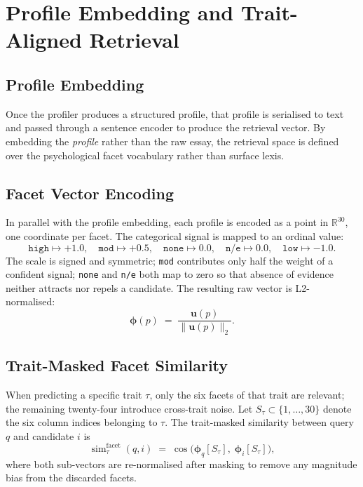 \documentclass[../main.tex]{subfiles}
\begin{document}
\section{Profile Embedding and Trait-Aligned Retrieval}
\label{sec:retrieval}

\subsection{Profile Embedding}
\label{subsec:profile-embedding}

Once the profiler produces a structured profile, that profile is serialised to
text and passed through a sentence encoder to produce the retrieval vector. By
embedding the \emph{profile} rather than the raw essay, the retrieval space is
defined over the psychological facet vocabulary rather than surface lexis.

\subsection{Facet Vector Encoding}
\label{subsec:facet-encoding}

In parallel with the profile embedding, each profile is encoded as a point
in $\mathbb{R}^{30}$, one coordinate per facet. The categorical signal is
mapped to an ordinal value:
%
\begin{equation}
  \label{eq:signal-map}
  \texttt{high}\mapsto +1.0,\quad
  \texttt{mod}\mapsto +0.5,\quad
  \texttt{none}\mapsto 0.0,\quad
  \texttt{n/e}\mapsto 0.0,\quad
  \texttt{low}\mapsto -1.0.
\end{equation}
%
The scale is signed and symmetric; \texttt{mod} contributes only half the
weight of a confident signal; \texttt{none} and \texttt{n/e} both map to
zero so that absence of evidence neither attracts nor repels a candidate.
The resulting raw vector is L2-normalised:
%
\begin{equation}
  \label{eq:facet-vector}
  \boldsymbol{\phi}(p) \;=\; \frac{\mathbf{u}(p)}{\lVert \mathbf{u}(p) \rVert_2}.
\end{equation}

\subsection{Trait-Masked Facet Similarity}
\label{subsec:trait-slice}

When predicting a specific trait $\tau$, only the six facets of that trait are
relevant; the remaining twenty-four introduce cross-trait noise. Let
$S_\tau \subset \{1,\dots,30\}$ denote the six column indices belonging to
$\tau$. The trait-masked similarity between query $q$ and candidate $i$ is
%
\begin{equation}
  \label{eq:facet-cosine}
  \operatorname{sim}^{\mathrm{facet}}_{\tau}(q, i)
  \;=\;
  \cos\!\big(
    \boldsymbol{\phi}_q[S_\tau],\;
    \boldsymbol{\phi}_i[S_\tau]
  \big),
\end{equation}
%
where both sub-vectors are re-normalised after masking to remove any magnitude
bias from the discarded facets.
\end{document}
